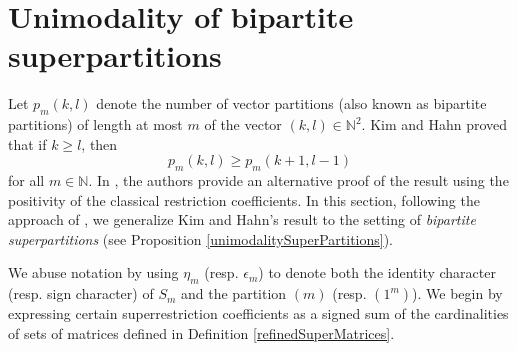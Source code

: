 \documentclass[12pt,reqno]{amsart}
\theoremstyle{definition}
\theoremstyle{remark}
\begin{document}
\section{Unimodality of bipartite superpartitions}\label{bipartiteNumbers}
Let $p_{m}(k,l)$ denote the number of vector partitions (also known as bipartite partitions) of length at most $m$ of the vector $(k,l)\in \mathbb{N}^2$. Kim and Hahn \cite{kim1997partitions} proved that if $k\geq l$, then
$$p_{m}(k,l)\geq p_{m}(k+1,l-1)$$
for all $m\in\mathbb{N}$. In \cite{narayanan2021polynomial}, the authors provide an alternative proof of the result using the positivity of the classical restriction coefficients. In this section, following the approach of \cite{narayanan2024hook}, we generalize Kim and Hahn's result to the setting of \textit{bipartite superpartitions} (see Proposition \ref{unimodalitySuperPartitions}).

We abuse notation by using $\eta_{m}$ (resp. $\epsilon_{m}$) to denote both the identity character (resp. sign character) of $S_m$ and the partition $(m)$ (resp. $(1^{m})$). We begin by expressing certain superrestriction coefficients as a signed sum of the cardinalities of sets of matrices defined in Definition \ref{refinedSuperMatrices}.
\end{document}
